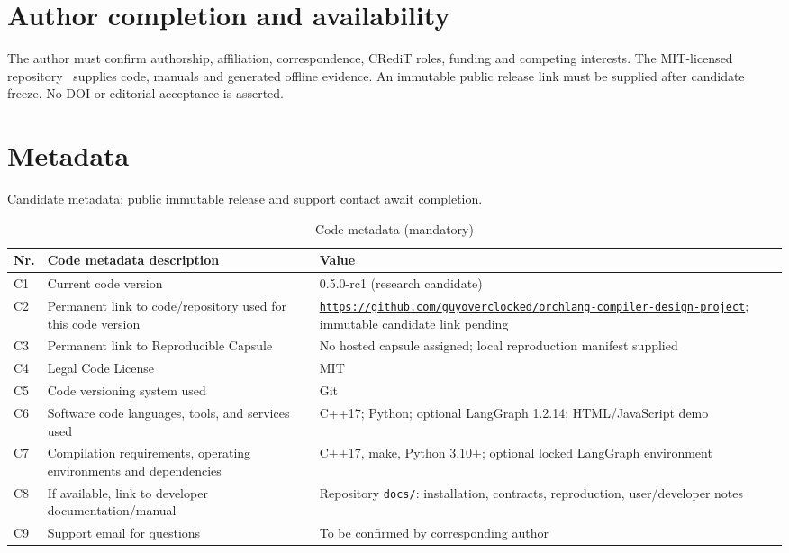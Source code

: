 \documentclass[preprint,12pt, a4paper]{elsarticle}
\begin{document}
\section*{Author completion and availability}
The author must confirm authorship, affiliation, correspondence, CRediT roles, funding and competing interests. The MIT-licensed repository~\cite{orchlang} supplies code, manuals and generated offline evidence. An immutable public release link must be supplied after candidate freeze. No DOI or editorial acceptance is asserted.
\section*{Metadata}
\label{tab:metadata}

Candidate metadata; public immutable release and support contact await completion.

\begin{table}[!h]
\begin{tabular}{|l|p{6.5cm}|p{6.5cm}|}
\hline
\textbf{Nr.} & \textbf{Code metadata description} & \textbf{Value} \\
\hline
C1 & Current code version & 0.5.0-rc1 (research candidate) \\
\hline
C2 & Permanent link to code/repository used for this code version & \href{https://github.com/guyoverclocked/orchlang-compiler-design-project}{\texttt{https://github.com/}\newline\texttt{guyoverclocked/}\newline\texttt{orchlang-compiler-design-}\newline\texttt{project}}; immutable candidate link pending \\
\hline
C3  & Permanent link to Reproducible Capsule & No hosted capsule assigned; local reproduction manifest supplied \\
\hline
C4 & Legal Code License   & MIT \\
\hline
C5 & Code versioning system used & Git \\
\hline
C6 & Software code languages, tools, and services used & C++17; Python; optional LangGraph 1.2.14; HTML/JavaScript demo \\
\hline
C7 & Compilation requirements, operating environments and dependencies & C++17, make, Python 3.10+; optional locked LangGraph environment \\
\hline
C8 & If available, link to developer documentation/manual & Repository \texttt{docs/}: installation, contracts, reproduction, user/developer notes \\
\hline
C9 & Support email for questions & To be confirmed by corresponding author \\
\hline
\end{tabular}
\caption{Code metadata (mandatory)}
\label{tab:code_metadata}
\end{table}
\end{document}
